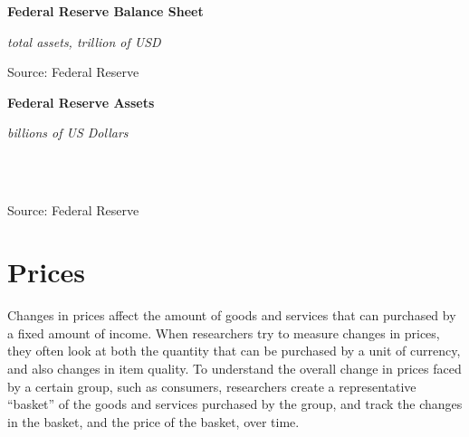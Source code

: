 \documentclass{report}
\makeatletter
\newcommand{\tbllink}[1]{\href{https://raw.githubusercontent.com/bdecon/US-chartbook/master/chartbook/data/#1}{\faTable}}
\newcommand*\short[1]{\expandafter\@gobbletwo\number\numexpr#1\relax}
\newcommand{\dateaxisticks}{
		date coordinates in=x, axis line style={draw=none},
		xmax={2020-08-10},
		max space between ticks=40,	    
		xtick={{1990-01-01}, {1992-01-01}, {1994-01-01}, 
			{1996-01-01}, {1998-01-01}, {2000-01-01}, 
			{2002-01-01}, {2004-01-01}, {2006-01-01},
			{2008-01-01}, {2010-01-01}, {2012-01-01}, {2014-01-01},
		    {2016-01-01}, {2018-01-01}, {2020-01-01}},
		minor xtick={{1989-01-01}, {1991-01-01}, {1993-01-01},
			{1995-01-01}, {1997-01-01}, {1999-01-01}, 
			{2001-01-01}, {2003-01-01}, {2005-01-01}, {2007-01-01},
		    {2009-01-01}, {2011-01-01}, {2013-01-01}, {2015-01-01},
		    {2017-01-01}, {2019-01-01}},
		enlarge y limits={0.06}, enlarge x limits={0.01},
		}
\newcommand{\bbar}[2]{extra #1 ticks = {{#2}}, extra #1 tick labels = ,
		extra #1 tick style = {grid=major, grid style={thick, black!25}},}
\newcommand{\stdline}[4]{\addplot[very thick, no markers, color=#1] 
		table [x=#2, y=#3, col sep=comma] {#4};	}
\makeatother
\begin{document}
{{{{{{{{{\begin{minipage}{0.39\textwidth}
\normalsize \textbf{Federal Reserve Balance Sheet}

\footnotesize{\textit{total assets, trillion of USD}}

\hspace*{-2mm} 

\footnotesize{Source: Federal Reserve} \hspace{22mm} \tbllink{fed_assets.csv}
\end{minipage}\hspace{1mm}
\begin{minipage}{0.36\textwidth}
\small 
\end{minipage}

\vspace{10mm}


\noindent \normalsize \textbf{Federal Reserve Assets}\\
\footnotesize{\textit{billions of US Dollars}\\ \vspace{4mm}
\noindent \hspace*{-3mm}  \setlength{\tabcolsep}{3.1pt} \color{black!90}
		{\renewcommand{\arraystretch}{1.54}
\begin{tabular}{p{40mm} R{13.0mm} R{13.0mm} R{13.0mm}
		 		 R{13.0mm} R{13.0mm}}
			 
			 \hline
		\end{tabular}
		}	\\}
		
\vspace{-5.5mm}
\footnotesize{Source: Federal Reserve}



\newpage

\begin{minipage}{0.76\textwidth}
\section*{\color{darkgray}\LARGE Prices}
\label{sec:pr}
\small 
Changes in prices affect the amount of goods and services that can purchased by a fixed amount of income. When researchers try to measure changes in prices, they often look at both the quantity that can be purchased by a unit of currency, and also changes in item quality. To understand the overall change in prices faced by a certain group, such as consumers, researchers create a representative ``basket'' of the goods and services purchased by the group, and track the changes in the basket, and the price of the basket, over time. 



\end{minipage}}}}}}}}}}
\end{document}
